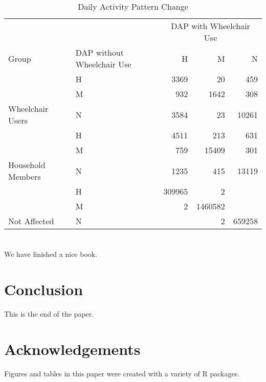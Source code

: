 \documentclass[3p, authoryear, review]{elsarticle} %
\begin{document}
\begin{table}

\caption{\label{tab:dap-summary}Daily Activity Pattern Change}
\centering
\begin{tabular}[t]{llrrr}
\toprule
\multicolumn{1}{c}{} & \multicolumn{1}{c}{} & \multicolumn{3}{c}{DAP with Wheelchair Use} \\
\cmidrule(l{3pt}r{3pt}){3-5}
Group & DAP without Wheelchair Use & H & M & N\\
\midrule
 & H & 3369 & 20 & 459\\

 & M & 932 & 1642 & 308\\

\multirow{-3}{*}{\raggedright\arraybackslash Wheelchair Users} & N & 3584 & 23 & 10261\\
\cmidrule{1-5}
 & H & 4511 & 213 & 631\\

 & M & 759 & 15409 & 301\\

\multirow{-3}{*}{\raggedright\arraybackslash Household Members} & N & 1235 & 415 & 13119\\
\cmidrule{1-5}
 & H & 309965 & 2 & \\

 & M & 2 & 1460582 & \\

\multirow{-3}{*}{\raggedright\arraybackslash Not Affected} & N &  & 2 & 659258\\
\bottomrule
\end{tabular}
\end{table}

\hypertarget{section}{%
\section{}\label{section}}

We have finished a nice book.

\hypertarget{conclusion}{%
\section{Conclusion}\label{conclusion}}

This is the end of the paper.

\hypertarget{acks}{%
\section*{Acknowledgements}\label{acks}}

Figures and tables in this paper were created with a variety of R
packages.


\end{document}
